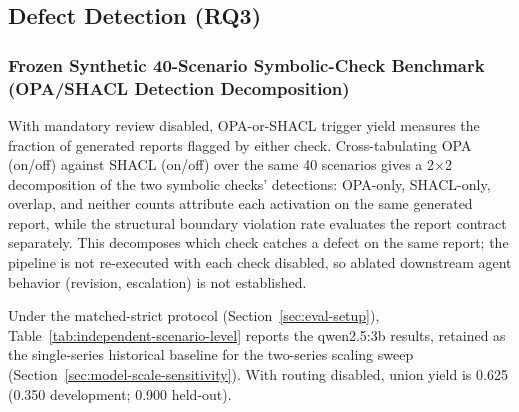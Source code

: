 \documentclass[journal,twoside,web]{ieeecolor}
\begin{document}
\subsection{Defect Detection (RQ3)}
\label{sec:rq3-defect-detection}

\subsubsection{Frozen Synthetic 40-Scenario Symbolic-Check Benchmark (OPA/SHACL Detection Decomposition)}
\label{sec:synthetic-40}

With mandatory review disabled, OPA-or-SHACL trigger yield measures the fraction of generated reports flagged by either check. Cross-tabulating OPA (on/off) against SHACL (on/off) over the same 40 scenarios gives a 2$\times$2 decomposition of the two symbolic checks' detections: OPA-only, SHACL-only, overlap, and neither counts attribute each activation on the same generated report, while the structural boundary violation rate evaluates the report contract separately. This decomposes which check catches a defect on the same report; the pipeline is not re-executed with each check disabled, so ablated downstream agent behavior (revision, escalation) is not established.

Under the matched-strict protocol (Section~\ref{sec:eval-setup}), Table~\ref{tab:independent-scenario-level} reports the qwen2.5:3b results, retained as the single-series historical baseline for the two-series scaling sweep (Section~\ref{sec:model-scale-sensitivity}). With routing disabled, union yield is 0.625 (0.350 development; 0.900 held-out).
\end{document}
